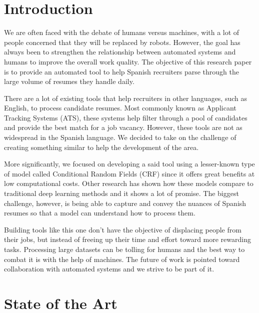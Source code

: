 
\chapter{Introduction} %

\label{Cap1} %


  We are often faced with the debate of humans versus machines, with a lot of
  people concerned that they will be replaced by robots. However, the goal has
  always been to strengthen the relationship between automated systems and
  humans to improve the overall work quality. The objective of this research
  paper is to provide an automated tool to help Spanish recruiters parse
  through the large volume of resumes they handle daily.

  There are a lot of existing tools that help recruiters in other languages,
  such as English, to process candidate resumes. Most commonly known as
  Applicant Tracking Systems (ATS), these systems help filter through a pool of
  candidates and provide the best match for a job vacancy. However, these tools
  are not as widespread in the Spanish language. We decided to take on the
  challenge of creating something similar to help the development of
  the area.

  More significantly, we focused on developing a said tool using a lesser-known
  type of model called Conditional Random Fields (CRF) since it offers great
  benefits at low computational costs. Other research has shown how these
  models compare to traditional deep learning methods and it shows a lot of
  promise. The biggest challenge, however, is being able to capture and convey
  the nuances of Spanish resumes so that a model can understand how to process
  them.

  Building tools like this one don't have the objective of displacing people
  from their jobs, but instead of freeing up their time and effort toward more
  rewarding tasks. Processing large datasets can be tolling for humans and the
  best way to combat it is with the help of machines. The future of work is
  pointed toward collaboration with automated systems and we strive to be part
  of it.




\chapter{State of the Art} %

